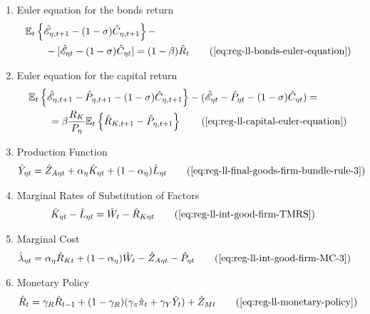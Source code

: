 \documentclass[
thesis.tex
]{subfiles}
\begin{document}
{\begin{itemize}
\begin{enumerate}
		\item Euler equation for the bonds return
		\begin{alignat}{2}
			& \E \left\{ \hat{\mathscr{E}}_{\eta, t+1} - (1 -\sigma)\hat{C}_{\eta, t+1} \right\} - \nonumber \\ & \qquad - [\hat{\mathscr{E}}_{\eta t} - (1 -\sigma)\hat{C}_{\eta t}] = (1 -\beta) \hat{R}_{t} \tag{\ref{eq:reg-ll-bonds-euler-equation}}
		\end{alignat}
		
		\item Euler equation for the capital return
		\begin{alignat}{2}
			& \E \left\{ \hat{\mathscr{E}}_{\eta, t+1} - \hat{P}_{\eta, t+1}  - (1 -\sigma) \hat{C}_{\eta, t+1} \right\} - (\hat{\mathscr{E}}_{\eta t} - \hat{P}_{\eta t} - (1 -\sigma) \hat{C}_{\eta t}) = \nonumber \\
			& \qquad = \beta \frac{R_{K}}{P_{\eta}} \mathbb{E}_t \left\{ \hat{R}_{K, t+1} - \hat{P}_{\eta, t+1} \right\} \tag{\ref{eq:reg-ll-capital-euler-equation}}
		\end{alignat}
		
		\item Production Function
		\begin{align}
			\hat{Y}_{\eta t} &= \hat{Z}_{A\eta t} + {\alpha_{\eta}} \hat{K}_{\eta t} + (1-{\alpha_{\eta}}) \hat{L}_{\eta t} \tag{\ref{eq:reg-ll-final-goods-firm-bundle-rule-3}}
		\end{align}
		
		\item Marginal Rates of Substitution of Factors
		\begin{align}
			\hat{K}_{\eta t} - \hat{L}_{\eta t} &= \hat{W}_{t} - \hat{R}_{K \eta t} \tag{\ref{eq:reg-ll-int-good-firm-TMRS}}
		\end{align}
		
		\item Marginal Cost
		\begin{alignat}{2}
			\hat{\lambda}_{\eta t} &= {\alpha_{\eta}} \hat{R}_{Kt} + (1- {\alpha_{\eta}}) \hat{W}_{t} - \hat{Z}_{A\eta t} - \hat{P}_{\eta t} \tag{\ref{eq:reg-ll-int-good-firm-MC-3}}
		\end{alignat}
		
		\item Monetary Policy
		\begin{align}
			& \hat{R}_t = \gamma_R \hat{R}_{t-1} + (1-\gamma_R)(\gamma_\pi \hat{\pi}_t + \gamma_Y \hat{Y}_t) + \hat{Z}_{Mt} \tag{\ref{eq:reg-ll-monetary-policy}}
		\end{align}
		

\end{enumerate}
\end{itemize}}
\end{document}
